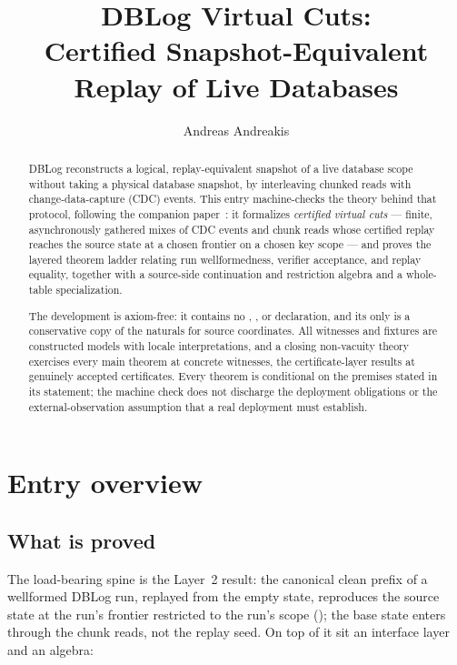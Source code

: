 \documentclass[11pt,a4paper]{article}
\begin{document}
\title{DBLog Virtual Cuts:\\
  Certified Snapshot-Equivalent Replay of Live Databases}
\author{Andreas Andreakis}
\maketitle

\begin{abstract}
  DBLog reconstructs a logical, replay-equivalent snapshot of a live
  database scope without taking a physical database snapshot, by
  interleaving chunked reads with change-data-capture (CDC) events.
  This entry machine-checks the theory behind that protocol, following
  the companion paper~\cite{andreakis2026theoretical}: it formalizes
  \emph{certified virtual cuts} --- finite, asynchronously gathered
  mixes of CDC events and chunk reads whose certified replay reaches
  the source state at a chosen frontier on a chosen key scope --- and
  proves the layered theorem ladder relating run wellformedness,
  verifier acceptance, and replay equality, together with a
  source-side continuation and restriction algebra and a whole-table
  specialization.

  The development is axiom-free: it contains no
  , , or  declaration,
  and its only  is a conservative copy of the naturals
  for source coordinates. All witnesses and fixtures are constructed
  models with locale interpretations, and a closing non-vacuity
  theory exercises every main theorem at concrete witnesses, the
  certificate-layer results at genuinely accepted certificates. Every theorem is conditional on the premises stated
  in its statement; the machine check does not discharge the
  deployment obligations or the external-observation assumption that
  a real deployment must establish.
\end{abstract}

\tableofcontents

\newpage

\section*{Entry overview}

\subsection*{What is proved}

The load-bearing spine is the Layer~2 result: the canonical clean
prefix of a wellformed DBLog run, replayed from the empty state,
reproduces the source state at the run's frontier restricted to the
run's scope ();
the base state enters through the chunk reads, not the replay seed.
On top of it sit an interface layer and an algebra:
\end{document}
